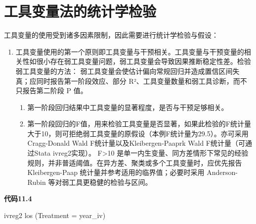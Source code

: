 \documentclass[
  chinese-hans,
  letterpaper,
  DIV=11,
  numbers=noendperiod]{scrreprt}
\newenvironment{Shaded}{\begin{snugshade}}{\end{snugshade}}
\newcommand{\NormalTok}[1]{\textcolor[rgb]{0.00,0.23,0.31}{#1}}
\providecommand{\tightlist}{%
  \setlength{\itemsep}{0pt}\setlength{\parskip}{0pt}}
\begin{document}
\section{工具变量法的统计学检验}\label{ux5de5ux5177ux53d8ux91cfux6cd5ux7684ux7edfux8ba1ux5b66ux68c0ux9a8c}

工具变量的使用受到诸多因素限制，因此需要进行统计学检验与假设：

\begin{enumerate}
\def\labelenumi{\arabic{enumi}.}
\item
  工具变量使用的第一个原则即工具变量与干预相关。工具变量与干预变量的相关性如很小存在弱工具变量问题，弱工具变量会导致因果推断稳定性差。检验弱工具变量的方法：
  弱工具变量会使估计偏向常规回归并造成置信区间失真；应同时报告第一阶段效应、部分
  R²、工具变量数量和弱工具诊断，而不只报告第二阶段 P 值。

  \begin{enumerate}
  \def\labelenumii{\arabic{enumii}.}
  \tightlist
  \item
    第一阶段回归结果中工具变量的显著程度，是否与干预足够相关。
  \item
    第一阶段回归的F值，用来检验工具变量是否显著，如果此检验的F统计量大于10，则可拒绝弱工具变量的原假设（本例F统计量为29.5）。亦可采用Cragg-Donald
    Wald F统计量以及Kleibergen-Paaprk Wald F统计量（可通过Stata
    ivreg2实现）。 F\textgreater10
    是单一内生变量、同方差情形下常见的经验规则，并非普适阈值。在异方差、聚类或多个工具变量时，应优先报告
    Kleibergen-Paap 统计量并参考适用的临界值；必要时采用 Anderson-Rubin
    等对弱工具更稳健的检验与区间。
  \end{enumerate}
\end{enumerate}

\begin{tcolorbox}[enhanced jigsaw, arc=.35mm, bottomrule=.15mm, breakable, colback=white, colframe=quarto-callout-note-color-frame, left=2mm, leftrule=.75mm, opacityback=0, rightrule=.15mm, toprule=.15mm]

\vspace{-3mm}\textbf{代码11.4}\vspace{3mm}

\begin{Shaded}
\begin{Highlighting}[]
\NormalTok{ivreg2 los (Treatment = year\_iv)}
\end{Highlighting}
\end{Shaded}

\end{tcolorbox}
\end{document}
